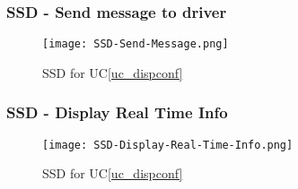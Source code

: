 \subsubsection{SSD - Send message to driver}
\begin{figure}[!htbp]
  \texttt{[image: SSD-Send-Message.png]}
  \caption{SSD for UC\vref{uc_dispconf}}
  \label{fig:SSD-Send-Message}
\end{figure}
\clearpage 


\subsubsection{SSD - Display Real Time Info}
\begin{figure}[!htbp]
  \texttt{[image: SSD-Display-Real-Time-Info.png]}
  \caption{SSD for UC\vref{uc_dispconf}}
  \label{fig:SSD-Display-Real-Time-Info}
\end{figure}
\clearpage 
